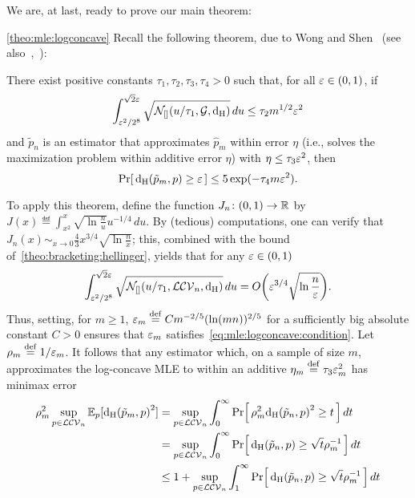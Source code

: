 We are, at last, ready to prove our main theorem:
\begin{proofof}{\cref{theo:mle:logconcave}}
    Recall the following theorem, due to Wong and Shen~\cite{WS:95} (see also~\cite[Theorem 7.4]{vdG:00},~\cite[Theorem 17]{KS:16}):
    \begin{theorem}[{\cite[Theorem 2]{WS:95}}]
        There exist positive constants $\tau_1,\tau_2,\tau_3,\tau_4>0$ such that, for all $\varepsilon\in(0,1)$, if
        \begin{equation}\label{eq:mle:logconcave:condition}
            \int_{\varepsilon^2/2^8}^{\sqrt{2}\varepsilon} \sqrt{\mathcal{N}_{[ ]}(u/\tau_1,\mathcal{G},\operatorname{d_{\rm{H}}})}\, du \leq \tau_2 m^{1/2}\varepsilon^2
        \end{equation}
        and $\tilde{p}_n$ is an estimator that approximates $\hat{p}_m$ within error $\eta$ (i.e., solves the maximization problem within additive error $\eta$) with $\eta \leq \tau_3\varepsilon^2$, then
        \[
            \Pr\!\left[\,  {\operatorname{d_{\rm{H}}}\!\left({\tilde{p}_m, p}\right)} \geq \varepsilon \, \right] \leq 5\exp(-\tau_4 m \varepsilon^2).
        \]
    \end{theorem}
    To apply this theorem, define the function $J_n\colon(0,1)\to\mathbb{R}$ by $J(x) \eqdef \int_{x^2}^x \sqrt{\ln\frac{n}{u}}u^{-1/4}\, du$. By (tedious) computations, one can verify that $J_n(x) \sim_{x\to 0} \frac{4}{3}x^{3/4}\sqrt{\ln\frac{n}{x}}$; this, combined with the bound of~\cref{theo:bracketing:hellinger}, yields that for any $\varepsilon\in(0,1)$
    \[
        \int_{\eps^2/2^8}^{\sqrt{2}\eps} \sqrt{\bracketing{u/\tau_1}{\classlogconcave[n]}}\, du = \bigO{\eps^{3/4}\sqrt{\ln\frac{n}{\eps}}}.
    \]
    Thus, setting, for $m\geq 1$, $\varepsilon_m \stackrel{\rm def}{=} C m^{-2/5}(\ln(mn))^{2/5}$ for a sufficiently big absolute constant $C>0$ ensures that $\varepsilon_m$ satisfies~\eqref{eq:mle:logconcave:condition}. Let $\rho_{m} \stackrel{\rm def}{=} 1/\varepsilon_m$. It follows that any estimator which, on a sample of size $m$, approximates the log-concave MLE to within an additive $\eta_m\stackrel{\rm def}{=} \tau_3\varepsilon_m^2$ has minimax error
    \begin{align*}
        \rho^2_{m}\sup_{p\in\classlogconcave[n]}\shortexpect_p[ \hellinger{\tilde{p}_m}{p}^2 ] &
        = \sup_{p\in\classlogconcave[n]} \int_0^\infty {  \probaOf{ \rho^2_{m} \hellinger{\tilde{p}_n}{p}^2 \geq t } }\, dt \\
        &= \sup_{p\in\classlogconcave[n]} \int_0^\infty {  \probaOf{  \hellinger{\tilde{p}_n}{p} \geq \sqrt{t}\rho^{-1}_{m} } }\, dt \\
        &\leq 1+ \sup_{p\in\classlogconcave[n]} \int_1^\infty {  \probaOf{  \hellinger{\tilde{p}_n}{p} \geq \sqrt{t}\rho^{-1}_{m} } }\, dt \\

\end{align*}
\end{proofof}
